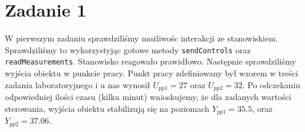 \chapter{Zadanie 1}

W pierwszym zadaniu sprawdziliśmy możliwośc interakcji ze stanowiskiem. Sprawdziliśmy to wykorzystyjąc gotowe metody \texttt{sendControls} oraz \texttt{readMeasurements}. Stanowisko reagowało
prawidłowo. Następnie sprawdziliśmy wyjścia obiektu w punkcie pracy. Punkt pracy zdefiniowany był wzorem w treści zadania laboratoryjnego i u nas wynosił $U_{pp1} = 27$ oraz $U_{pp2} = 32$.
Po odczekaniu odpowiedniej ilości czasu (kilku minut) wnioskujemy, że dla zadanych wartości sterowania, wyjścia obiektu stabilizują się na poziomach $Y_{pp1} = 35.5$, oraz $Y_{pp2} = 37.06$.
